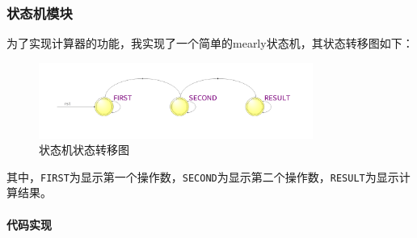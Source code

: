 \documentclass[UTF8]{ctexart}
\newcommand{\subsubsubsection}[1]{\paragraph{#1}\mbox{}\\}
\begin{document}
\subsubsection{状态机模块}
为了实现计算器的功能，我实现了一个简单的mearly状态机，其状态转移图如下：
\begin{figure}[H]
	\centering
	\includegraphics[width=0.8\textwidth]{task1_3_3.png}
	\caption{状态机状态转移图}
\end{figure}
其中，\texttt{FIRST}为显示第一个操作数，\texttt{SECOND}为显示第二个操作数，\texttt{RESULT}为显示计算结果。
\subsubsubsection{代码实现}
\end{document}
